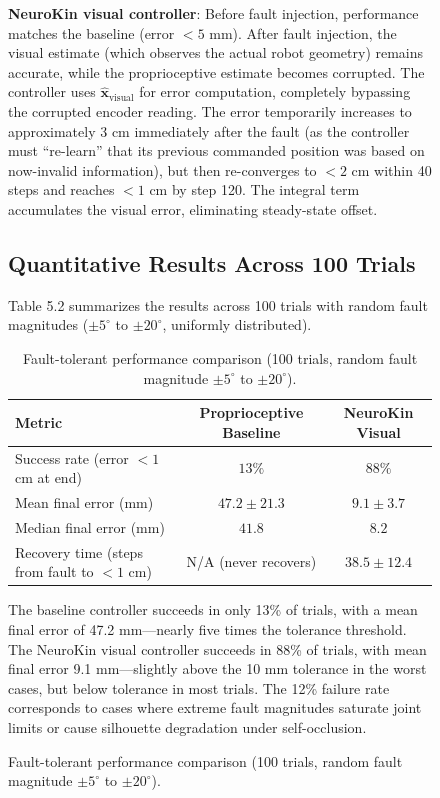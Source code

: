 \documentclass[12pt,a4paper,oneside]{report}
\begin{document}
\begin{figure}[H]
\textbf{NeuroKin visual controller}: Before fault injection, performance matches the baseline (error $<5$ mm). After fault injection, the visual estimate (which observes the actual robot geometry) remains accurate, while the proprioceptive estimate becomes corrupted. The controller uses $\hat{\mathbf{x}}_{\text{visual}}$ for error computation, completely bypassing the corrupted encoder reading. The error temporarily increases to approximately 3 cm immediately after the fault (as the controller must ``re-learn'' that its previous commanded position was based on now-invalid information), but then re-converges to $<2$ cm within 40 steps and reaches $<1$ cm by step 120. The integral term accumulates the visual error, eliminating steady-state offset.

\subsection{Quantitative Results Across 100 Trials}

Table 5.2 summarizes the results across 100 trials with random fault magnitudes ($\pm5^\circ$ to $\pm20^\circ$, uniformly distributed).

\begin{table}[H]
\centering
\caption{Fault-tolerant performance comparison (100 trials, random fault magnitude $\pm5^\circ$ to $\pm20^\circ$).}
\label{tab:fault_performance_ch5}
\begin{tabular}{lcc}
\toprule
\textbf{Metric} & \textbf{Proprioceptive Baseline} & \textbf{NeuroKin Visual} \\
\midrule
Success rate (error $<1$ cm at end) & $13\%$ & $88\%$ \\
Mean final error (mm) & $47.2 \pm 21.3$ & $9.1 \pm 3.7$ \\
Median final error (mm) & $41.8$ & $8.2$ \\
Recovery time (steps from fault to $<1$ cm) & N/A (never recovers) & $38.5 \pm 12.4$ \\
\bottomrule
\end{tabular}
\end{table}

The baseline controller succeeds in only 13\% of trials, with a mean final error of 47.2 mm---nearly five times the tolerance threshold. The NeuroKin visual controller succeeds in 88\% of trials, with mean final error 9.1 mm---slightly above the 10 mm tolerance in the worst cases, but below tolerance in most trials. The 12\% failure rate corresponds to cases where extreme fault magnitudes saturate joint limits or cause silhouette degradation under self-occlusion.


\end{figure}
\end{document}
